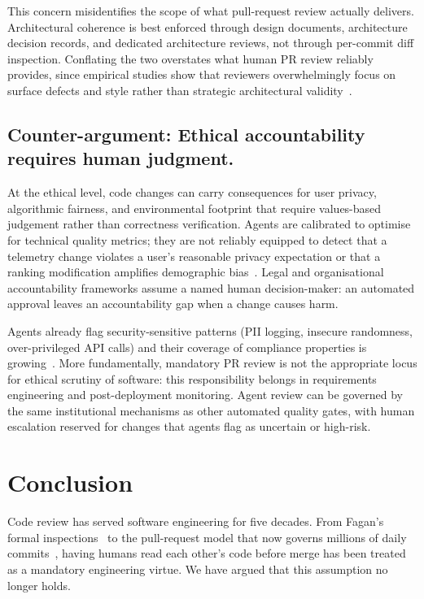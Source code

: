 \documentclass[10pt,conference]{IEEEtran}
\begin{document}
This concern misidentifies the scope of what pull-request review actually delivers.
Architectural coherence is best enforced through design documents, architecture decision records, and dedicated architecture reviews, not through per-commit diff inspection.
Conflating the two overstates what human PR review reliably provides, since empirical studies show that reviewers overwhelmingly focus on surface defects and style rather than strategic architectural validity~\cite{czerwonka2015code,bacchelli2013expectations}.

\subsection{Counter-argument: Ethical accountability requires human judgment.}
At the ethical level, code changes can carry consequences for user privacy, algorithmic fairness, and environmental footprint that require values-based judgement rather than correctness verification.
Agents are calibrated to optimise for technical quality metrics; they are not reliably equipped to detect that a telemetry change violates a user's reasonable privacy expectation or that a ranking modification amplifies demographic bias~\cite{bosu2016process}.
Legal and organisational accountability frameworks assume a named human decision-maker: an automated approval leaves an accountability gap when a change causes harm.


Agents already flag security-sensitive patterns (PII logging, insecure randomness, over-privileged API calls) and their coverage of compliance properties is growing~\cite{pearce2022asleep,khoury2023secure}.
More fundamentally, mandatory PR review is not the appropriate locus for ethical scrutiny of software: this responsibility belongs in requirements engineering and post-deployment monitoring.
Agent review can be governed by the same institutional mechanisms as other automated quality gates, with human escalation reserved for changes that agents flag as uncertain or high-risk.


\section{Conclusion}
\label{sec:conclusion}

Code review has served software engineering for five decades.
From Fagan's formal inspections~\cite{fagan1976design} to the pull-request model that now governs millions of daily commits~\cite{bacchelli2013expectations}, having humans read each other's code before merge has been treated as a mandatory engineering virtue.
We have argued that this assumption no longer holds.
\end{document}
